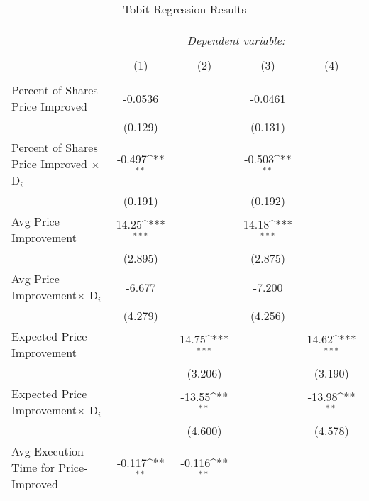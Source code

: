 \documentclass[12pt,a4paper]{article}
\def\sym#1{\ifmmode^{#1}\else\(^{#1}\)\fi}
\begin{document}
\begin{table}[t] 
	\caption{Tobit Regression Results} 
	\label{} 
	\footnotesize
	\begin{tabular}{@{\extracolsep{0.6em}}lcccc} 
		\\[-4ex]\hline  
		\hline \\[-1.8ex]  
		& \multicolumn{4}{c}{\textit{Dependent variable:}} \\  
		\cline{2-5}  
		\\[-1.8ex] & (1) & (2) & (3) & (4)\\  
		\hline \\[-1.8ex]  
				Percent of Shares Price Improved   &     -0.0536         &                     &     -0.0461         &                     \\
		&     (0.129)         &                     &     (0.131)         &                     \\
		[0.5em]
		Percent of Shares Price Improved  $\times$ D$_i$  &  -0.497\sym{**} &                     &      -0.503\sym{**} &                     \\
		&     (0.191)         &                     &     (0.192)         &                     \\
		[0.5em]
		Avg Price Improvement&       14.25\sym{***}&                     &       14.18\sym{***}&                     \\
		&     (2.895)         &                     &     (2.875)         &                     \\
		[0.5em]
		Avg Price Improvement$\times$ D$_i$&      -6.677         &                     &      -7.200         &                     \\
		&     (4.279)         &                     &     (4.256)         &                     \\
		[0.5em]
		Expected Price Improvement&                     &       14.75\sym{***}&                     &       14.62\sym{***}\\
		&                     &     (3.206)         &                     &     (3.190)         \\
		[0.5em]
		Expected Price Improvement$\times$ D$_i$&                     &      -13.55\sym{**} &                     &      -13.98\sym{**} \\
		&                     &     (4.600)         &                     &     (4.578)         \\
		[0.5em]
		Avg Execution Time for Price-Improved  &      -0.117\sym{**} &      -0.116\sym{**} &                     &                     \\

\end{tabular}
\end{table}
\end{document}

